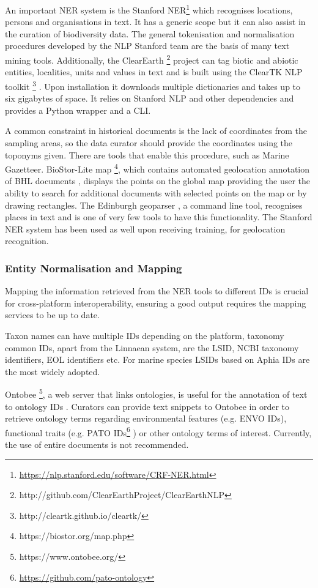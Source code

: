 An important NER system is the Stanford NER\footnote{\url{https://nlp.stanford.edu/software/CRF-NER.html}}
\cite{finkel_incorporating_2005} which recognises locations, persons and
organisations in text. It has a generic scope but it can also assist in the
curation of biodiversity data. The general tokenisation and normalisation
procedures developed by the NLP Stanford team are the basis of many text mining
tools. Additionally, the ClearEarth \footnote{http://github.com/ClearEarthProject/ClearEarthNLP}
project \cite{thessen_automated_2018} can tag biotic and abiotic entities,
localities, units and values in text and is built using the ClearTK NLP
toolkit \footnote{http://cleartk.github.io/cleartk/} \cite{bethard_cleartk_2014}.
Upon installation it downloads multiple dictionaries and takes up to six
gigabytes of space. It relies on Stanford NLP and other dependencies and
provides a Python wrapper and a CLI.

A common constraint in historical documents is the lack of coordinates from the
sampling areas, so the data curator should provide the coordinates using the
toponyms given. There are tools that enable this procedure, such as Marine
Gazetteer. BioStor-Lite map \footnote{https://biostor.org/map.php}, which
contains automated geolocation annotation of BHL documents
\cite{page_text-mining_2019}, displays the points on the global map providing
the user the ability to search for additional documents with selected points on
the map or by drawing rectangles. The Edinburgh geoparser
\cite{alex_adapting_2015}, a command line tool, recognises places in text and
is one of very few tools to have this functionality. The Stanford NER system
has been used as well \cite{stahlman_geoparsing_2019} upon receiving training,
for geolocation recognition.

   \subsubsection{Entity Normalisation and Mapping}
   Mapping the information retrieved from the NER tools to different IDs is
crucial for cross-platform interoperability, ensuring a good output requires
the mapping services to be up to date.

Taxon names can have multiple IDs depending on the platform, taxonomy common
IDs, apart from the Linnaean system, are the LSID, NCBI taxonomy identifiers,
EOL identifiers etc. For marine species LSIDs based on Aphia IDs are the most
widely adopted.

Ontobee \footnote{https://www.ontobee.org/}, a web server that links
ontologies, is useful for the annotation of text to ontology IDs
\cite{xiang_ontobee_2011}. Curators can provide text snippets to Ontobee in
order to retrieve ontology terms regarding environmental features (e.g. ENVO
IDs), functional traits (e.g. PATO
IDs\footnote{\url{https://github.com/pato-ontology}} \cite{tan_pato-ontologypato_2022})
or other ontology terms of interest. Currently, the use of entire documents is
not recommended.

